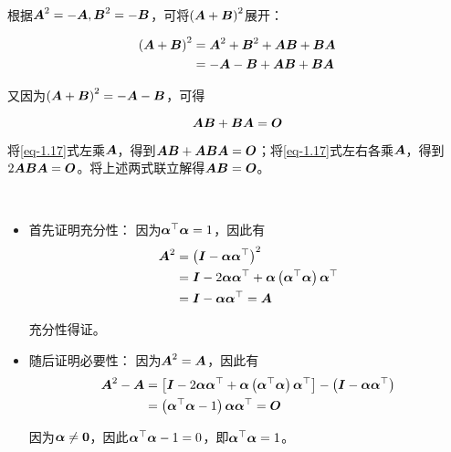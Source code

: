 \documentclass{ctexart}
\begin{document}
\begin{problem}\

根据\(\mata^2=-\mata,\matb^2=-\matb\)，可将\(\mypar{\mata+\matb}^2\)展开：

\begin{align*}
    \mypar{\mata+\matb}^2 & =\mata^2+\matb^2+\mata\matb+\matb\mata \\
                          & =-\mata-\matb+\mata\matb+\matb\mata
\end{align*}

又因为\(\mypar{\mata+\matb}^2=-\mata-\matb\)，可得

\begin{equation}\label{eq-1.17}
    \mata\matb+\matb\mata=\mato
\end{equation}

将\eqref{eq-1.17}式左乘\(\mata\)，得到\(\mata\matb+\mata\matb\mata=\mato\)；将\eqref{eq-1.17}式左右各乘\(\mata\)，得到\(2\mata\matb\mata=\mato\)。将上述两式联立解得\(\mata\matb=\mato\)。

\end{problem}

\setcounter{problem}{18}
\begin{problem}\

\begin{itemize}
    \item 首先证明充分性：
          因为\(\vecal^\top\vecal=1\)，因此有
          \begin{align*}
              \mata^2 & =\mypar{\mati-\vecal\vecal^\top}^2                                   \\
                      & =\mati-2\vecal\vecal^\top+\vecal\mypar{\vecal^\top\vecal}\vecal^\top \\
                      & =\mati-\vecal\vecal^\top=\mata
          \end{align*}

          充分性得证。

    \item 随后证明必要性：
          因为\(\mata^2=\mata\)，因此有
          \begin{align*}
              \mata^2-\mata & =\mat{\mati-2\vecal\vecal^\top+\vecal\mypar{\vecal^\top\vecal}\vecal^\top}-\mypar{\mati-\vecal\vecal^\top} \\
                            & =\mypar{\vecal^\top\vecal-1}\vecal\vecal^\top=\mato
          \end{align*}

          因为\(\vecal\neq\veczero\)，因此\(\vecal^\top\vecal-1=0\)，即\(\vecal^\top\vecal=1\)。
\end{itemize}

\end{problem}
\end{document}
